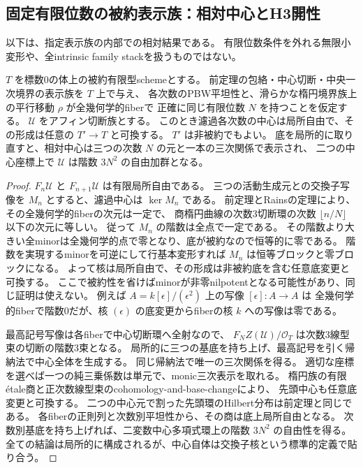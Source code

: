 \subsection{固定有限位数の被約表示族：相対中心とH3開性}
\label{subsec:finite-order-relative}
以下は、指定表示族の内部での相対結果である。
有限位数条件を外れる無限小変形や、全intrinsic family stackを扱うものではない。

\begin{theorem}[被約底上の相対中心と任意底変更]
\label{thm:finite-order-relative-center}
$T$ を標数0の体上の被約有限型schemeとする。
前定理の包絡・中心切断・中央一次境界の表示族を $T$ 上で与え、
各次数のPBW平坦性と、滑らかな楕円境界族上の平行移動 $\rho$ が全幾何学的fiberで
正確に同じ有限位数 $N$ を持つことを仮定する。
$\mathcal U$ をアフィン切断族とする。
このとき濾過各次数の中心は局所自由で、その形成は任意の $T'\to T$ と可換する。
$T'$ は非被約でもよい。
底を局所的に取り直すと、相対中心は三つの次数 $N$ の元と一本の三次関係で表示され、
二つの中心座標上で $\mathcal U$ は階数 $3N^2$ の自由加群となる。
\end{theorem}
\begin{proof}
$F_n\mathcal U$ と $F_{n+1}\mathcal U$ は有限局所自由である。
三つの活動生成元との交換子写像を $M_n$ とすると、濾過中心は $\ker M_n$ である。
前定理とRainsの定理により、その全幾何学的fiberの次元は一定で、
商楕円曲線の次数3切断環の次数 $\lfloor n/N\rfloor$ 以下の次元に等しい。
従って $M_n$ の階数は全点で一定である。
その階数より大きい全minorは全幾何学的点で零となり、底が被約なので恒等的に零である。
階数を実現するminorを可逆にして行基本変形すれば $M_n$ は恒等ブロックと零ブロックになる。
よって核は局所自由で、その形成は非被約底を含む任意底変更と可換する。
ここで被約性を省けばminorが非零nilpotentとなる可能性があり、同じ証明は使えない。
例えば $A=k[\epsilon]/(\epsilon^2)$ 上の写像 $[\epsilon]:A\to A$ は
全幾何学的fiberで階数0だが、核 $(\epsilon)$ の底変更からfiberの核 $k$ への写像は零である。

最高記号写像は各fiberで中心切断環へ全射なので、
$F_NZ(\mathcal U)/\mathcal O_T$ は次数3線型束の切断の階数3束となる。
局所的に三つの基底を持ち上げ、最高記号を引く帰納法で中心全体を生成する。
同じ帰納法で唯一の三次関係を得る。
適切な座標を選べば一つの純三乗係数は単元で、monic三次表示を取れる。
楕円族の有限\'{e}tale商と正次数線型束のcohomology-and-base-changeにより、
先頭中心も任意底変更と可換する。
二つの中心元で割った先頭環のHilbert分布は前定理と同じである。
各fiberの正則列と次数別平坦性から、その商は底上局所自由となる。
次数別基底を持ち上げれば、二変数中心多項式環上の階数 $3N^2$ の自由性を得る。
全ての結論は局所的に構成されるが、中心自体は交換子核という標準的定義で貼り合う。
\end{proof}

